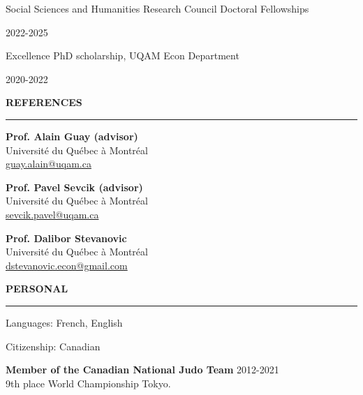\documentclass{article}
\begin{document}
	\noindent\parbox[t]{0.65\textwidth}{Social Sciences and Humanities Research Council Doctoral Fellowships}%
	\hfill
	2022-2025\\
	\vspace{4pt}
	
	\noindent\parbox[t]{0.65\textwidth}{Excellence PhD scholarship, UQAM Econ Department}%
	\hfill
	2020-2022
	\vspace{6pt}
	\newline%
	
	\noindent\textbf{\large REFERENCES} 
	\vspace{4pt}
	\hrule
	\vspace{6pt} 
	\noindent\parbox[t]{0.45\textwidth}{\textbf{Prof. Alain Guay (advisor)}\\
		Université du Québec à Montréal\\
		\href{mailto:guay.alain@uqam.ca}{guay.alain@uqam.ca}
	}
    \hfill 
    \noindent\parbox[t]{0.45\textwidth}{\textbf{Prof. Pavel Sevcik (advisor)}\\
    	Université du Québec à Montréal\\
    	\href{mailto:sevcik.pavel@uqam.ca}{sevcik.pavel@uqam.ca}
    }%
   \vspace{10pt}
   
   \noindent\parbox[t]{0.45\textwidth}{\textbf{Prof. Dalibor Stevanovic}\\
   	Université du Québec à Montréal\\
   	\href{mailto:dstevanovic.econ@gmail.com}{dstevanovic.econ@gmail.com}
   }%


	\vspace{6pt}
	
	\noindent\textbf{\large PERSONAL} 
	\vspace{4pt}
	\hrule
	\vspace{6pt} 
	\noindent Languages: French, English
	\vspace{4pt}
	
	\noindent Citizenship: Canadian
	\vspace{4pt}
	
    \noindent \textbf{Member of the Canadian National Judo Team} \hfill 2012-2021\\
    \noindent 9th place World Championship Tokyo.
	
	
\end{document}
